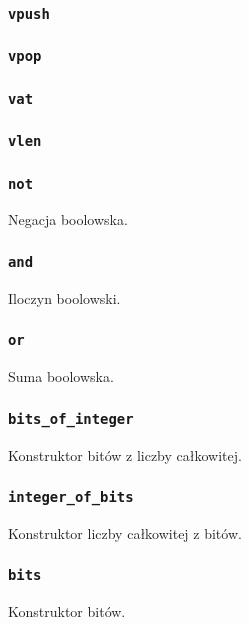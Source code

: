 \subsubsection{\texttt{vpush}}
\subsubsection{\texttt{vpop}}
\subsubsection{\texttt{vat}}
\subsubsection{\texttt{vlen}}

\subsubsection{\texttt{not}}

Negacja boolowska.

\subsubsection{\texttt{and}}

Iloczyn boolowski.

\subsubsection{\texttt{or}}

Suma boolowska.

\subsubsection{\texttt{bits\_of\_integer}}

Konstruktor bitów z liczby całkowitej.

\subsubsection{\texttt{integer\_of\_bits}}

Konstruktor liczby całkowitej z bitów.

\subsubsection{\texttt{bits}}

Konstruktor bitów.

